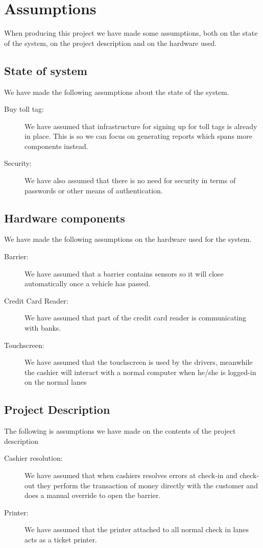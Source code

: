 
\section{Assumptions}
\madeby{\af}{\mb} When producing this project we have made some assumptions, both on the state of the system, on the project description and on the hardware used.

\subsection{State of system}
We have made the following assumptions about the state of the system.
\begin{description}
\item [Buy toll tag:] We have assumed that infrastructure for signing up for toll tags is already in place. 
This is so we can focus on generating reports which spans more components instead. 

\item [Security:] We have also assumed that there is no need for security in terms of passwords or other means of authentication.

\end{description}

\subsection{Hardware components}
We have made the following assumptions on the hardware used for the system.
\begin{description}
\item [Barrier:] We have assumed that a barrier contains sensors so it will close automatically once a vehicle has passed.

\item [Credit Card Reader:] We have assumed that part of the credit card reader is communicating with banks.

\item[Touchscreen:] We have assumed that the touchscreen is used by the drivers, meanwhile the cashier will interact with a normal computer when he/she is logged-in on the normal lanes

\end{description}

\subsection{Project Description}
The following is assumptions we have made on the contents of the project description
\begin{description}
\item [Cashier resolution:] We have assumed that when cashiers resolves errors at check-in and check-out they perform the transaction of money directly with the customer and does a manual override to open the barrier.

\item [Printer:] We have assumed that the printer attached to all normal check in lanes acts as a ticket printer.
\end{description}


